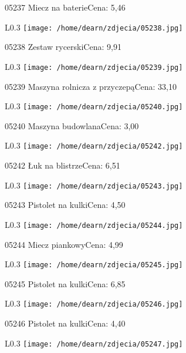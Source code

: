 05237 Miecz na baterieCena: 5,46\newline
\begin{wrapfigure}{L}{0.3\textwidth}
\texttt{[image: /home/dearn/zdjecia/05238.jpg]}
\end{wrapfigure}
05238 Zestaw rycerskiCena: 9,91\newline
\begin{wrapfigure}{L}{0.3\textwidth}
\texttt{[image: /home/dearn/zdjecia/05239.jpg]}
\end{wrapfigure}
05239 Maszyna rolnicza z przyczepąCena: 33,10\newline
\begin{wrapfigure}{L}{0.3\textwidth}
\texttt{[image: /home/dearn/zdjecia/05240.jpg]}
\end{wrapfigure}
05240 Maszyna budowlanaCena: 3,00\newline
\begin{wrapfigure}{L}{0.3\textwidth}
\texttt{[image: /home/dearn/zdjecia/05242.jpg]}
\end{wrapfigure}
05242 Łuk na blistrzeCena: 6,51\newline
\begin{wrapfigure}{L}{0.3\textwidth}
\texttt{[image: /home/dearn/zdjecia/05243.jpg]}
\end{wrapfigure}
05243 Pistolet na kulkiCena: 4,50\newline
\begin{wrapfigure}{L}{0.3\textwidth}
\texttt{[image: /home/dearn/zdjecia/05244.jpg]}
\end{wrapfigure}
05244 Miecz piankowyCena: 4,99\newline
\begin{wrapfigure}{L}{0.3\textwidth}
\texttt{[image: /home/dearn/zdjecia/05245.jpg]}
\end{wrapfigure}
05245 Pistolet na kulkiCena: 6,85\newline
\begin{wrapfigure}{L}{0.3\textwidth}
\texttt{[image: /home/dearn/zdjecia/05246.jpg]}
\end{wrapfigure}
05246 Pistolet na kulkiCena: 4,40\newline
\begin{wrapfigure}{L}{0.3\textwidth}
\texttt{[image: /home/dearn/zdjecia/05247.jpg]}
\end{wrapfigure}
